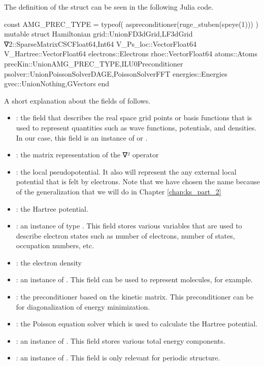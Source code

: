 The definition of the  struct can be seen in the following
Julia code.
\begin{fullwidth}
\begin{juliacode}
const AMG_PREC_TYPE = typeof( aspreconditioner(ruge_stuben(speye(1))) )
mutable struct Hamiltonian
    grid::Union{FD3dGrid,LF3dGrid}
    ∇2::SparseMatrixCSC{Float64,Int64}
    V_Ps_loc::Vector{Float64}
    V_Hartree::Vector{Float64}
    electrons::Electrons
    rhoe::Vector{Float64}
    atoms::Atoms
    precKin::Union{AMG_PREC_TYPE,ILU0Preconditioner}
    psolver::Union{PoissonSolverDAGE,PoissonSolverFFT}
    energies::Energies
    gvec::Union{Nothing,GVectors}
end
\end{juliacode}
\end{fullwidth}
%
A short explanation about the fields of  follows.
\begin{itemize}
%
  \item {}: the field that describes the real space grid points or
basis functions that is used to represent quantities such as wave functions,
potentials, and densities. In our case, this field is an instance of
 or .
%
\item {}: the matrix representation of the ∇² operator
%
\item {}: the local pseudopotential. It also will represent the
any external local potential that is felt by electrons.
Note that we have chosen the name  because of the
generalization that we will do in Chapter \ref{chap:ks_part_2}
%
\item {}: the Hartree potential.
%
\item {}: an instance of type . This field
stores various variables that are used to describe electron states such as number
of electrons, number of states, occupation numbers, etc.
%
\item {}: the electron density
%
\item {}: an instance of . This field can be used to represent
molecules, for example.
%
\item {}: the preconditioner based on the kinetic matrix. This preconditioner
can be for diagonalization of energy minimization.
%
\item {}: the Poisson equation solver which is used to calculate the Hartree
potential.
%
\item {}: an instance of . This field stores
various total energy components.
%
\item {}: an instance of . This field is only relevant for
periodic structure.
%
\end{itemize}


